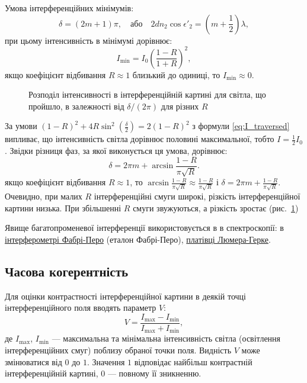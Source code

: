 Умова інтерференційних мінімумів:
\begin{equation}\label{}
	\delta = (2m+1)\pi,\quad \text{або}\quad 2 dn_2\cos\epsilon'_2 = \left(m + \frac12\right)\lambda,
\end{equation}
при цьому інтенсивність в мінімумі дорівнює:
\begin{equation}\label{eq:manyrays_I}
	I_{\min} = I_0 \left( \frac{1-R}{1+R} \right)^2,
\end{equation}
якщо коефіцієнт відбивання $R \approx 1$ близький до одиниці, то $ I_{\min} \approx 0$.

\begin{figure}[htbp!]\centering
	
	\caption{Розподіл інтенсивності в інтерференційній картині для світла, що пройшло, в залежності від $\delta/(2\pi)$ для різних $R$}
	\label{pic:plot_manyrays}
\end{figure}

За умови $(1-R)^2 + 4R\sin^2\left( \frac\delta2\right)  = 2(1-R)^2$ з формули \eqref{eq:I_traversed} випливає, що інтенсивність світла дорівнює половині максимальної, тобто $I = \frac12 I_0$. Звідки різниця фаз, за якої виконується ця умова, дорівнює:
\begin{equation}\label{eq:manyrays_I_ddelta}
	\delta = 2\pi m + \arcsin\frac{1-R}{\pi\sqrt{R}}.
\end{equation}
якщо коефіцієнт відбивання $R \approx 1$, то $\arcsin\frac{1-R}{\pi\sqrt{R}} \approx \frac{1-R}{\pi\sqrt{R}} $ і $\delta = 2\pi m + \frac{1-R}{\pi\sqrt{R}}$.
Очевидно, при малих $ R $ інтерференційні смуги широкі, різкість інтерференційної картини низька. При збільшенні $ R $ смуги звужуються, а різкість зростає (рис.~\ref{pic:plot_manyrays})

Явище багатопроменевої інтерференції використовується в
в спектроскопії: в \href{https://www.youtube.com/watch?v=BT675FhuvuA\&ab_channel=toc1955}{інтерферометрі Фабрі-Перо} (еталон Фабрі-Перо), \href{https://uk.upwiki.one/wiki/Lummer%E2%80%93Gehrcke_interferometer}{платівці Люмера-Герке}.




\subsection*{Часова когерентність}


Для оцінки контрастності
інтерференційної картини в деякій точці інтерференційного
поля вводять параметр  $V$:
\begin{equation}\label{eq:vis_par}
	V = \frac{I_{\max} - I_{\min}}{I_{\max} + I_{\min}},
\end{equation}
де $I_{\max}$, $I_{\min}$ --- максимальна та мінімальна інтенсивність світла
(освітлення інтерференційних смуг) поблизу обраної точки
поля. Видність $V$ може змінюватися від $0$ до $1$. Значення $1$
відповідає найбільш контрастній інтерференційній картині,
$0$ --- повному її зникненню.

